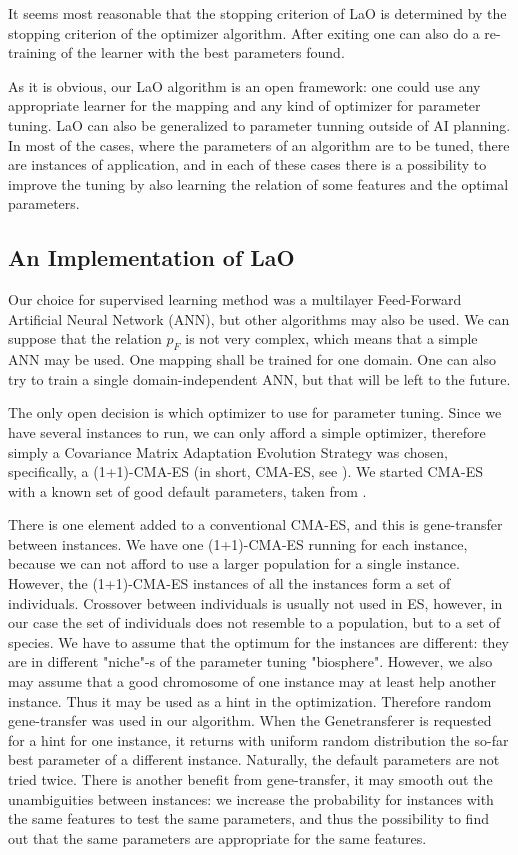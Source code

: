 \documentclass{acm_proc_article-sp}
\begin{document}
It seems most reasonable that the stopping criterion of LaO is determined by the stopping criterion of the optimizer algorithm. After exiting one can also do a re-training of the learner with the best parameters found.

As it is obvious, our LaO algorithm is an open framework: one could use any appropriate learner for the mapping and any kind of optimizer for parameter tuning. LaO can also be generalized to parameter tunning outside of AI planning. In most of the cases, where the parameters of an algorithm are to be tuned, there are instances of application, and in each of these cases there is a possibility to improve the tuning by also learning the relation of some features and the optimal parameters.

\subsection{An Implementation of LaO}

Our choice for supervised learning method was a multilayer Feed-Forward Artificial Neural Network (ANN), but other algorithms may also be used. We can suppose that the relation \begin{math}p_F\end{math} is not very complex, which means that a simple ANN may be used. One mapping shall be trained for one domain. One can also try to train a single domain-independent ANN, but that will be left to the future.

The only open decision is which optimizer to use for parameter tuning. Since we have several instances to run, we can only afford a simple optimizer, therefore simply a Covariance Matrix Adaptation Evolution Strategy was chosen, specifically, a (1+1)-CMA-ES (in short, CMA-ES, see \cite{hansen2001ecj}). We started CMA-ES with a known set of good default parameters, taken from \cite{BibGECCO:2010}.

There is one element added to a conventional CMA-ES, and this is gene-transfer between instances. We have one (1+1)-CMA-ES running for each instance, because we can not afford to use a larger population for a single instance. However, the (1+1)-CMA-ES instances of all the instances form a set of individuals. Crossover between individuals is usually not used in ES, however, in our case the set of individuals does not resemble to a population, but to a set of species. We have to assume that the optimum for the instances are different: they are in different "niche"-s of the parameter tuning "biosphere". However, we also may assume that a good chromosome of one instance may at least help another instance. Thus it may be used as a hint in the optimization. Therefore random gene-transfer was used in our algorithm. When the Genetransferer is requested for a hint for one instance, it returns with uniform random distribution the so-far best parameter of a different instance. Naturally, the default parameters are not tried twice. There is another benefit from gene-transfer, it may smooth out the unambiguities between instances: we increase the probability for instances with the same features to test the same parameters, and thus the possibility to find out that the same parameters are appropriate for the same features.
\end{document}
